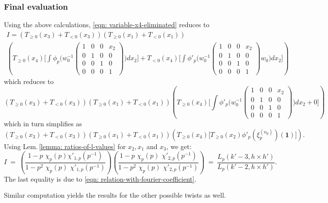 \documentclass[11pt]{amsart}
\begin{document}
\subsubsection{Final evaluation}
Using the above calculations, \eqref{eqn: variable-x4-eliminated} reduces to
\begin{multline*}
I = (T_{\geq 0}(x_3) + T_{<0}(x_3))(T_{\geq 0}(x_1) + T_{<0}(x_1)) \\ 
\left(T_{\geq 0}(x_4) \biggl[ \int \phi_p \biggl( w_0^{-1}
	\left(\begin{smallmatrix}
		1 & 0 & 0 & x_{2} \\
		0 & 1 & 0 & 0 \\
		0 & 0 & 1 & 0 \\
		0 & 0 & 0 & 1
	\end{smallmatrix}\right)   \biggr) dx_2 \biggr] + T_{< 0}(x_4) \biggl[ \int \phi'_p \biggl( w_0^{-1}
	\left(\begin{smallmatrix}
		1 & 0 & 0 & x_{2} \\
		0 & 1 & 0 & 0 \\
		0 & 0 & 1 & 0 \\
		0 & 0 & 0 & 1
	\end{smallmatrix}\right)  w_0  \biggr) dx_2 \biggr] \right)
\end{multline*}
which reduces to 
$$
(T_{\geq 0}(x_3) + T_{<0}(x_3))(T_{\geq 0}(x_1) + T_{<0}(x_1))
\left(T_{\geq 0}(x_4) \biggl[ \int \phi'_p \biggl( w_0^{-1}
	\left(\begin{smallmatrix}
		1 & 0 & 0 & x_{2} \\
		0 & 1 & 0 & 0 \\
		0 & 0 & 1 & 0 \\
		0 & 0 & 0 & 1
	\end{smallmatrix}\right)   \biggr) dx_2 + 0 \biggr] \right)
$$
which in turn simplifies as
$$
(T_{\geq 0}(x_3) + T_{<0}(x_3))(T_{\geq 0}(x_1) + T_{<0}(x_1))
\left(T_{\geq 0}(x_4) \biggl[ T_{\geq 0}(x_2) \phi'_p(\xi_p^{(n_p)})(\underline{\mathbf{1}})\biggr] \right).
$$
Using Lem.\,\ref{lemma: ratios-of-l-values} for $x_2, x_1$ and $x_3$, we get:
$$
I 
\ = \ 
	\left(\dfrac{1-p \,\,\chi_p(p) \chi'_{1,p}(p^{-1})}{1-p^{2} \,\,\chi_p(p) \,\,\chi'_{1,p}(p^{-1})}\right)
	\left( \dfrac{1-p \,\,\chi_p(p) \,\,\chi'_{2,p}(p^{-1})}{1-p^{2} \,\,\chi_p(p) \,\,\chi'_{2,p}(p^{-1})} \right) 
\ = \ 
\frac{L_p(k'-3, h\times h')}{L_p(k'-2, h \times h')}.
$$
The last equality is due to \eqref{eqn: relation-with-fourier-coefficient}. 

Similar computation yields the results for the other possible twists as well.
\end{document}
